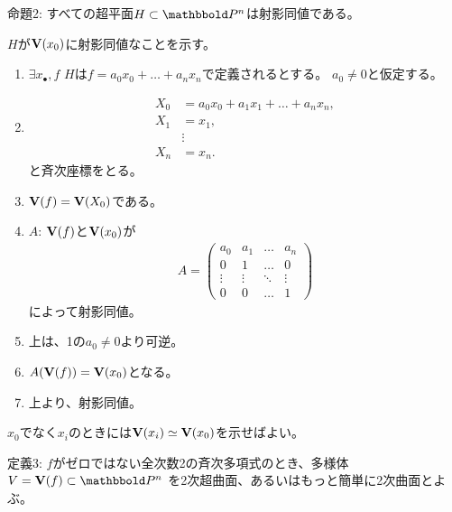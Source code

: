 \begin{framed}
  命題2:
  すべての超平面$H \subset \P^n$は射影同値である。
\end{framed}
\begin{myproof}
  $H$が$\textbf V(x_0)$に射影同値なことを示す。
  \begin{enumerate}
    \item $\exists x_\bullet,f$
    $H$は$f=a_0x_0 + \dots + a_n x_n$で定義されるとする。
    $a_0\neq 0$と仮定する。
    \item
    \begin{align}
      X_0 &= a_0 x_0 + a_1 x_1 + \dots + a_n x_n,\\
      X_1 &= x_1,\\
      &\vdots\\
      X_n &= x_n.
    \end{align}
    と斉次座標をとる。
    \item
    $\textbf V(f) = \textbf V(X_0)$である。
    \item $A$:
    $\textbf V(f)$と$\textbf V(x_0)$が
    \begin{align}
      A=
      \begin{pmatrix}
        a_0 & a_1 & \ldots & a_n\\
        0 & 1 & \ldots & 0\\
        \vdots & \vdots & \ddots & \vdots \\
        0 & 0 & \ldots & 1
      \end{pmatrix}
    \end{align}
    によって射影同値。
    \item
    上は、1の$a_0\neq 0$より可逆。
    \item
    $A(\textbf V(f)) = \textbf V(x_0)$となる。
    \item
    上より、射影同値。
  \end{enumerate}
  $x_0$でなく$x_i$のときには$\textbf V(x_i) \simeq \textbf V(x_0)$を示せばよい。
\end{myproof}

\begin{framed}
  定義3:
  $f$がゼロではない全次数2の斉次多項式のとき、多様体$V=\var(f) \subset \P^n$
  を2次超曲面、あるいはもっと簡単に2次曲面とよぶ。
\end{framed}

